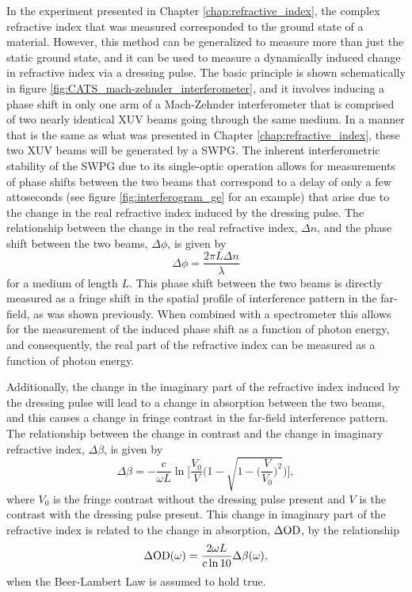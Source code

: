 In the experiment presented in Chapter \ref{chap:refractive_index}, the complex refractive index that was measured corresponded to the ground state of a material.  However, this method can be generalized to measure more than just the static ground state, and it can be used to measure a dynamically induced change in refractive index via a dressing pulse.  The basic principle is shown schematically in figure \ref{fig:CATS_mach-zehnder_interferometer}, and it involves inducing a phase shift in only one arm of a Mach-Zehnder interferometer that is comprised of two nearly identical XUV beams going through the same medium. In a manner that is the same as what was presented in Chapter \ref{chap:refractive_index}, these two XUV beams will be generated by a SWPG.  The inherent interferometric stability of the SWPG due to its single-optic operation allows for measurements of phase shifts between the two beams that correspond to a delay of only a few attoseconds (see figure \ref{fig:interferogram_ge} for an example) that arise due to the change in the real refractive index induced by the dressing pulse.  The relationship between the change in the real refractive index, $\Delta n$, and the phase shift between the two beams, $\Delta\phi$, is given by
\begin{equation}
	\label{eqn:phase_shift_dn}
	\Delta \phi = \frac{2\pi L \Delta n}{\lambda}
\end{equation}
for a medium of length $L$.  This phase shift between the two beams is directly measured as a fringe shift in the spatial profile of interference pattern in the far-field, as was shown previously. When combined with a spectrometer this allows for the measurement of the induced phase shift as a function of photon energy, and consequently, the real part of the refractive index can be measured as a function of photon energy.  

Additionally, the change in the imaginary part of the refractive index induced by the dressing pulse will lead to a change in absorption between the two beams, and this causes a change in fringe contrast in the far-field interference pattern.  The relationship between the change in contrast and the change in imaginary refractive index, $\Delta \beta$,  is given by
\begin{equation}
	\label{eqn:beta_fringe_contrast_chap_cats}
	\Delta\beta = -\frac{c}{\omega L} \ln\Bigg[\frac{V_0}{V}\Bigg(1-\sqrt{1-\bigg(\frac{V}{V_0}\bigg)^2}\Bigg)\Bigg],
\end{equation}
where $V_0$ is the fringe contrast without the dressing pulse present and $V$ is the contrast with the dressing pulse present.  This change in imaginary part of the refractive index is related to the change in absorption, $\Delta\mathrm{OD}$, by the relationship
\begin{equation}
	\label{eqn:dod_to_beta}
	\Delta\mathrm{OD}(\omega) = \frac{2 \omega L}{c \ln 10}\Delta \beta(\omega),
\end{equation}
when the Beer-Lambert Law is assumed to hold true. 

